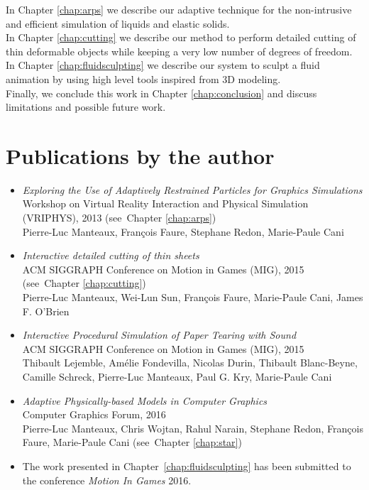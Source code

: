 In Chapter \ref{chap:arps} we describe our adaptive technique for the non-intrusive and efficient simulation of liquids and elastic solids. \\

In Chapter \ref{chap:cutting} we describe our method to perform detailed cutting of thin deformable objects while keeping a very low number of degrees of freedom.  \\

In Chapter \ref{chap:fluidsculpting} we describe our system to sculpt  a fluid animation by using high level tools inspired from 3D modeling. \\

Finally, we conclude this work in Chapter \ref{chap:conclusion} and discuss limitations and possible future work.

\section{Publications by the author}
\begin{itemize}
    \item \cite{Manteaux2013} \emph{Exploring the Use of Adaptively Restrained Particles for Graphics Simulations} \\
    Workshop on Virtual Reality Interaction and Physical Simulation (VRIPHYS), 2013 (see~Chapter \ref{chap:arps})\\
    Pierre-Luc Manteaux, François Faure, Stephane Redon, Marie-Paule Cani
    \item \cite{Manteaux2015} \emph{Interactive detailed cutting of thin sheets} \\
        ACM SIGGRAPH Conference on Motion in Games (MIG), 2015 (see~Chapter \ref{chap:cutting})\\
        Pierre-Luc Manteaux, Wei-Lun Sun, François Faure, Marie-Paule Cani, James F. O'Brien
            \item \cite{Lejemble2015} \emph{Interactive Procedural Simulation of Paper Tearing with Sound} \\
    ACM SIGGRAPH Conference on Motion in Games (MIG), 2015 \\
    Thibault Lejemble, Amélie Fondevilla, Nicolas Durin, Thibault Blanc-Beyne, Camille Schreck, Pierre-Luc Manteaux, Paul G. Kry, Marie-Paule Cani
\item \cite{Manteaux2016} \emph{Adaptive Physically-based Models in Computer Graphics} \\
    Computer Graphics Forum, 2016 \\
    Pierre-Luc Manteaux, Chris Wojtan, Rahul Narain, Stephane Redon, Fran\c cois Faure, Marie-Paule Cani (see~Chapter \ref{chap:star})
\item The work presented in Chapter~\ref{chap:fluidsculpting} has been submitted to the conference \emph{Motion In Games} 2016.
\end{itemize}
